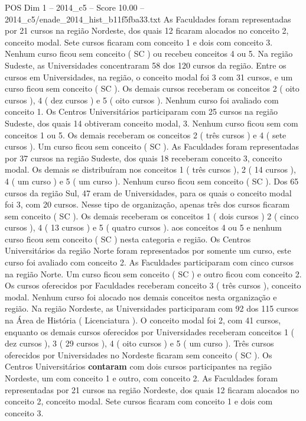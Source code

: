 \begin{textsample}{POS Dim 1 – 2014\_c5 – Score 10.00 – 2014\_c5/enade\_2014\_hist\_b11f5fba33.txt}
As Faculdades foram representadas por 21 cursos na região Nordeste, dos quais 12 ficaram alocados no conceito 2, conceito modal.
Sete cursos ficaram com conceito 1 e dois com conceito 3.
Nenhum curso ficou sem conceito ( SC ) ou recebeu conceitos 4 ou 5.
Na região Sudeste, as Universidades concentraram 58 dos 120 cursos da região.
Entre os cursos em Universidades, na região, o conceito modal foi 3 com 31 cursos, e um curso ficou sem conceito ( SC ).
Os demais cursos receberam os conceitos 2 ( oito cursos ), 4 ( dez cursos ) e 5 ( oito cursos ).
Nenhum curso foi avaliado com conceito 1.
Os Centros Universitários participaram com 25 cursos na região Sudeste, dos quais 14 obtiveram conceito modal, 3.
Nenhum curso ficou sem com conceitos 1 ou 5.
Os demais receberam os conceitos 2 ( três cursos ) e 4 ( sete cursos ).
Um curso ficou sem conceito ( SC ).
As Faculdades foram representadas por 37 cursos na região Sudeste, dos quais 18 receberam conceito 3, conceito modal.
Os demais se distribuíram nos conceitos 1 ( três cursos ), 2 ( 14 cursos ), 4 ( um curso ) e 5 ( um curso ).
Nenhum curso ficou sem conceito ( SC ).
Dos 65 cursos da região Sul, 47 eram de Universidades, para os quais o conceito modal foi 3, com 20 cursos.
Nesse tipo de organização, apenas três dos cursos ficaram sem conceito ( SC ).
Os demais receberam os conceitos 1 ( dois cursos ) 2 ( cinco cursos ), 4 ( 13 cursos ) e 5 ( quatro cursos ). aos conceitos 4 ou 5 e nenhum curso ficou sem conceito ( SC ) nesta categoria e região.
Os Centros Universitários da região Norte foram representados por somente um curso, este curso foi avaliado com conceito 2.
As Faculdades participaram com cinco cursos na região Norte.
Um curso ficou sem conceito ( SC ) e outro ficou com conceito 2.
Os cursos oferecidos por Faculdades receberam conceito 3 ( três cursos ), conceito modal.
Nenhum curso foi alocado nos demais conceitos nesta organização e região.
Na região Nordeste, as Universidades participaram com 92 dos 115 cursos na Área de História ( Licenciatura ).
O conceito modal foi 2, com 41 cursos, enquanto os demais cursos oferecidos por Universidades receberam conceitos 1 ( dez cursos ), 3 ( 29 cursos ), 4 ( oito cursos ) e 5 ( um curso ).
Três cursos oferecidos por Universidades no Nordeste ficaram sem conceito ( SC ).
Os Centros Universitários \textbf{contaram} com dois cursos participantes na região Nordeste, um com conceito 1 e outro, com conceito 2.
As Faculdades foram representadas por 21 cursos na região Nordeste, dos quais 12 ficaram alocados no conceito 2, conceito modal.
Sete cursos ficaram com conceito 1 e dois com conceito 3.

\end{textsample}
